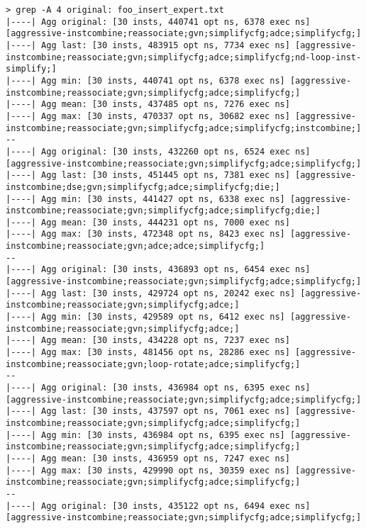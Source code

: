 \documentclass{vldb}
\newcommand{\dbCode}[1]{{\sffamily\small \textbf{#1}}\xspace}
\begin{document}
\begin{lstlisting}[caption={Results of Query \dbCode{INSERT INTO foo VALUES (1)} with Expert Optimizations},label={lst:simpleexpertopt}]
> grep -A 4 original: foo_insert_expert.txt  
|----| Agg original: [30 insts, 440741 opt ns, 6378 exec ns] [aggressive-instcombine;reassociate;gvn;simplifycfg;adce;simplifycfg;]
|----| Agg last: [30 insts, 483915 opt ns, 7734 exec ns] [aggressive-instcombine;reassociate;gvn;simplifycfg;adce;simplifycfg;nd-loop-inst-simplify;]
|----| Agg min: [30 insts, 440741 opt ns, 6378 exec ns] [aggressive-instcombine;reassociate;gvn;simplifycfg;adce;simplifycfg;]
|----| Agg mean: [30 insts, 437485 opt ns, 7276 exec ns]
|----| Agg max: [30 insts, 470337 opt ns, 30682 exec ns] [aggressive-instcombine;reassociate;gvn;simplifycfg;adce;simplifycfg;instcombine;]
--
|----| Agg original: [30 insts, 432260 opt ns, 6524 exec ns] [aggressive-instcombine;reassociate;gvn;simplifycfg;adce;simplifycfg;]
|----| Agg last: [30 insts, 451445 opt ns, 7381 exec ns] [aggressive-instcombine;dse;gvn;simplifycfg;adce;simplifycfg;die;]
|----| Agg min: [30 insts, 441427 opt ns, 6338 exec ns] [aggressive-instcombine;reassociate;gvn;simplifycfg;adce;simplifycfg;die;]
|----| Agg mean: [30 insts, 444231 opt ns, 7000 exec ns]
|----| Agg max: [30 insts, 472348 opt ns, 8423 exec ns] [aggressive-instcombine;reassociate;gvn;adce;adce;simplifycfg;]
--
|----| Agg original: [30 insts, 436893 opt ns, 6454 exec ns] [aggressive-instcombine;reassociate;gvn;simplifycfg;adce;simplifycfg;]
|----| Agg last: [30 insts, 429724 opt ns, 20242 exec ns] [aggressive-instcombine;reassociate;gvn;simplifycfg;adce;]
|----| Agg min: [30 insts, 429589 opt ns, 6412 exec ns] [aggressive-instcombine;reassociate;gvn;simplifycfg;adce;]
|----| Agg mean: [30 insts, 434228 opt ns, 7237 exec ns]
|----| Agg max: [30 insts, 481456 opt ns, 28286 exec ns] [aggressive-instcombine;reassociate;gvn;loop-rotate;adce;simplifycfg;]
--
|----| Agg original: [30 insts, 436984 opt ns, 6395 exec ns] [aggressive-instcombine;reassociate;gvn;simplifycfg;adce;simplifycfg;]
|----| Agg last: [30 insts, 437597 opt ns, 7061 exec ns] [aggressive-instcombine;reassociate;gvn;simplifycfg;adce;simplifycfg;]
|----| Agg min: [30 insts, 436984 opt ns, 6395 exec ns] [aggressive-instcombine;reassociate;gvn;simplifycfg;adce;simplifycfg;]
|----| Agg mean: [30 insts, 436959 opt ns, 7247 exec ns]
|----| Agg max: [30 insts, 429990 opt ns, 30359 exec ns] [aggressive-instcombine;reassociate;gvn;simplifycfg;adce;simplifycfg;]
--
|----| Agg original: [30 insts, 435122 opt ns, 6494 exec ns] [aggressive-instcombine;reassociate;gvn;simplifycfg;adce;simplifycfg;]

\end{lstlisting}
\end{document}
